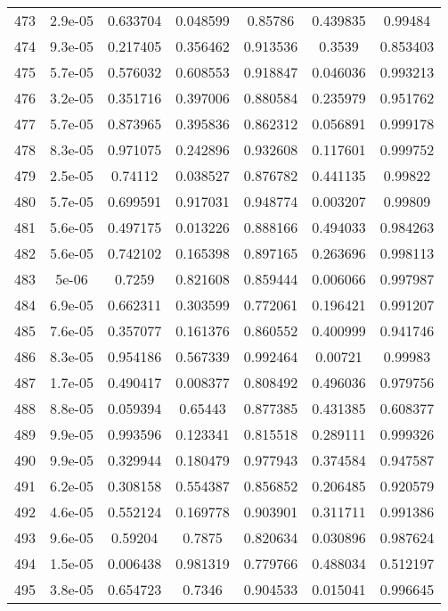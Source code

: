 \begin{table}
\begin{tabular}{c|c|c|c|c|c|c}
473 & 2.9e-05 & 0.633704 & 0.048599 & 0.85786 & 0.439835 & 0.99484\\
474 & 9.3e-05 & 0.217405 & 0.356462 & 0.913536 & 0.3539 & 0.853403\\
475 & 5.7e-05 & 0.576032 & 0.608553 & 0.918847 & 0.046036 & 0.993213\\
476 & 3.2e-05 & 0.351716 & 0.397006 & 0.880584 & 0.235979 & 0.951762\\
477 & 5.7e-05 & 0.873965 & 0.395836 & 0.862312 & 0.056891 & 0.999178\\
478 & 8.3e-05 & 0.971075 & 0.242896 & 0.932608 & 0.117601 & 0.999752\\
479 & 2.5e-05 & 0.74112 & 0.038527 & 0.876782 & 0.441135 & 0.99822\\
480 & 5.7e-05 & 0.699591 & 0.917031 & 0.948774 & 0.003207 & 0.99809\\
481 & 5.6e-05 & 0.497175 & 0.013226 & 0.888166 & 0.494033 & 0.984263\\
482 & 5.6e-05 & 0.742102 & 0.165398 & 0.897165 & 0.263696 & 0.998113\\
483 & 5e-06 & 0.7259 & 0.821608 & 0.859444 & 0.006066 & 0.997987\\
484 & 6.9e-05 & 0.662311 & 0.303599 & 0.772061 & 0.196421 & 0.991207\\
485 & 7.6e-05 & 0.357077 & 0.161376 & 0.860552 & 0.400999 & 0.941746\\
486 & 8.3e-05 & 0.954186 & 0.567339 & 0.992464 & 0.00721 & 0.99983\\
487 & 1.7e-05 & 0.490417 & 0.008377 & 0.808492 & 0.496036 & 0.979756\\
488 & 8.8e-05 & 0.059394 & 0.65443 & 0.877385 & 0.431385 & 0.608377\\
489 & 9.9e-05 & 0.993596 & 0.123341 & 0.815518 & 0.289111 & 0.999326\\
490 & 9.9e-05 & 0.329944 & 0.180479 & 0.977943 & 0.374584 & 0.947587\\
491 & 6.2e-05 & 0.308158 & 0.554387 & 0.856852 & 0.206485 & 0.920579\\
492 & 4.6e-05 & 0.552124 & 0.169778 & 0.903901 & 0.311711 & 0.991386\\
493 & 9.6e-05 & 0.59204 & 0.7875 & 0.820634 & 0.030896 & 0.987624\\
494 & 1.5e-05 & 0.006438 & 0.981319 & 0.779766 & 0.488034 & 0.512197\\
495 & 3.8e-05 & 0.654723 & 0.7346 & 0.904533 & 0.015041 & 0.996645\\
\end{tabular}
\end{table}

